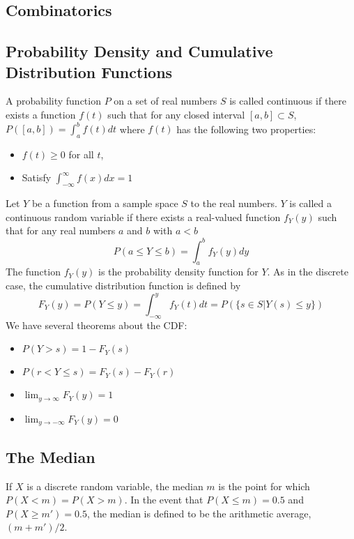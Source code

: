 \subsection{Combinatorics}

\subsection{Probability Density and Cumulative Distribution Functions}

A probability function $P$ on a set of real numbers $S$ is called continuous if there exists a function $f(t)$ such that for any closed interval $[a,b] \subset S$, $P([a,b])=\int_a^b f(t) dt$ where $f(t)$ has the following two properties: \begin{itemize}
\item $f(t) \geq 0$ for all $t$,

\item Satisfy $\int_{-\infty}^{\infty} f(x)dx = 1$
\end{itemize}

Let $Y$ be a function from a sample space $S$ to the real numbers. $Y$ is called a continuous random variable if there exists a real-valued function $f_Y(y)$ such that for any real numbers $a$ and $b$ with $a<b$ $$P(a \leq Y \leq b) = \int_a^b f_Y(y)dy$$ The function $f_Y(y)$ is the probability density function for $Y$. As in the discrete case, the cumulative distribution function is defined by $$F_Y(y) = P(Y \leq y) = \int_{-\infty}^{y}f_Y(t)dt = P(\{s \in S | Y(s) \leq y \})$$ We have several theorems about the CDF:
\begin{itemize}
\item $P(Y > s) = 1 - F_Y(s)$

\item $P(r < Y \leq s) = F_Y(s) - F_Y(r)$

\item $\lim_{y \to \infty} F_Y(y) = 1$

\item $\lim_{y \to -\infty} F_Y(y) = 0$
\end{itemize}


\subsection{The Median}

If $X$ is a discrete random variable, the median $m$ is the point for which $P(X < m) = P(X > m)$. In the event that $P(X \leq m) = 0.5$ and $P(X \geq m') = 0.5$, the median is defined to be the arithmetic average, $(m + m')/2$.

